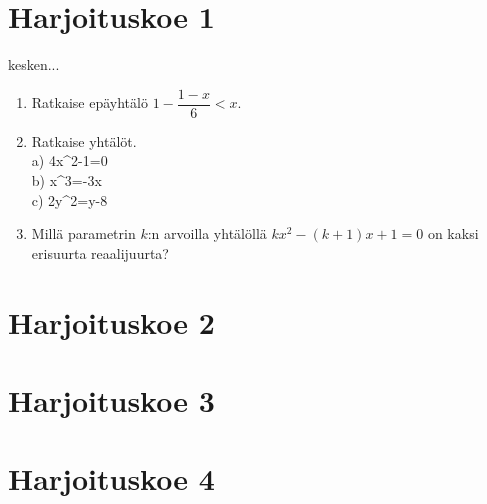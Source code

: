 \section{Harjoituskoe 1}

kesken... 
\begin{enumerate}
\item Ratkaise epäyhtälö $1-\dfrac{1-x}{6}<x$.
\item Ratkaise yhtälöt. \\ a) 4x^2-1=0 \\ b) x^3=-3x \\ c) 2y^2=y-8
\item Millä parametrin $k$:n arvoilla yhtälöllä $kx^2-(k+1)x+1=0$ on kaksi erisuurta reaalijuurta? 
\end{enumerate}

\section{Harjoituskoe 2}


\section{Harjoituskoe 3}


\section{Harjoituskoe 4}